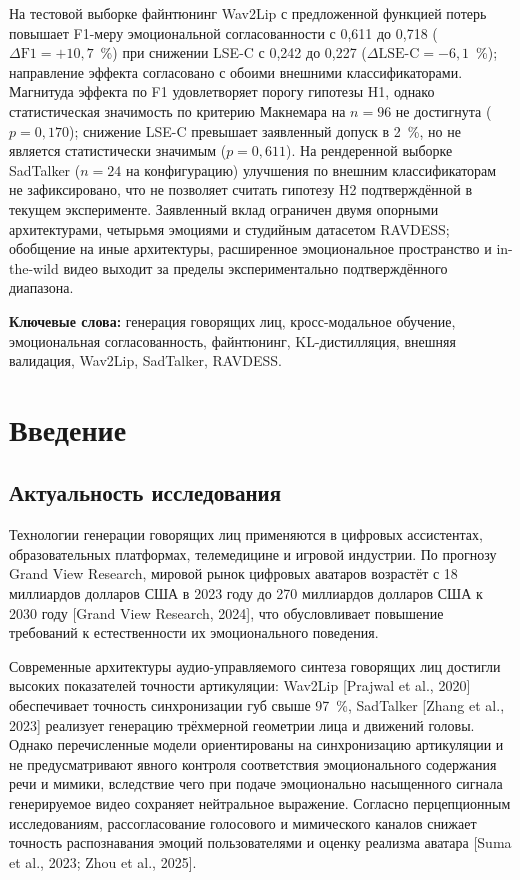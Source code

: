 \documentclass[a4paper, 12pt, oneside, openany]{article}
\begin{document}
На тестовой выборке файнтюнинг Wav2Lip с предложенной функцией потерь повышает F1-меру эмоциональной согласованности с 0,611 до 0,718 ($\Delta\text{F1}=+10{,}7$~\%) при снижении LSE-C с 0,242 до 0,227 ($\Delta\text{LSE-C}=-6{,}1$~\%); направление эффекта согласовано с обоими внешними классификаторами. Магнитуда эффекта по F1 удовлетворяет порогу гипотезы H1, однако статистическая значимость по критерию Макнемара на $n=96$ не достигнута ($p = 0{,}170$); снижение LSE-C превышает заявленный допуск в 2~\%, но не является статистически значимым ($p = 0{,}611$). На рендеренной выборке SadTalker ($n=24$ на конфигурацию) улучшения по внешним классификаторам не зафиксировано, что не позволяет считать гипотезу H2 подтверждённой в текущем эксперименте. Заявленный вклад ограничен двумя опорными архитектурами, четырьмя эмоциями и студийным датасетом RAVDESS; обобщение на иные архитектуры, расширенное эмоциональное пространство и in-the-wild видео выходит за пределы экспериментально подтверждённого диапазона.

\textbf{Ключевые слова:} генерация говорящих лиц, кросс-модальное обучение, эмоциональная согласованность, файнтюнинг, KL-дистилляция, внешняя валидация, Wav2Lip, SadTalker, RAVDESS.

\newpage
\tableofcontents  %
\suppressfloats
\newpage

\section{Введение}

\subsection{Актуальность исследования}

Технологии генерации говорящих лиц применяются в цифровых ассистентах, образовательных платформах, телемедицине и игровой индустрии. По прогнозу Grand View Research, мировой рынок цифровых аватаров возрастёт с 18 миллиардов долларов США в 2023 году до 270 миллиардов долларов США к 2030 году [Grand View Research, 2024], что обусловливает повышение требований к естественности их эмоционального поведения.

Современные архитектуры аудио-управляемого синтеза говорящих лиц достигли высоких показателей точности артикуляции: Wav2Lip [Prajwal et al., 2020] обеспечивает точность синхронизации губ свыше 97~\%, SadTalker [Zhang et al., 2023] реализует генерацию трёхмерной геометрии лица и движений головы. Однако перечисленные модели ориентированы на синхронизацию артикуляции и не предусматривают явного контроля соответствия эмоционального содержания речи и мимики, вследствие чего при подаче эмоционально насыщенного сигнала генерируемое видео сохраняет нейтральное выражение. Согласно перцепционным исследованиям, рассогласование голосового и мимического каналов снижает точность распознавания эмоций пользователями и оценку реализма аватара [Suma et al., 2023; Zhou et al., 2025].
\end{document}
